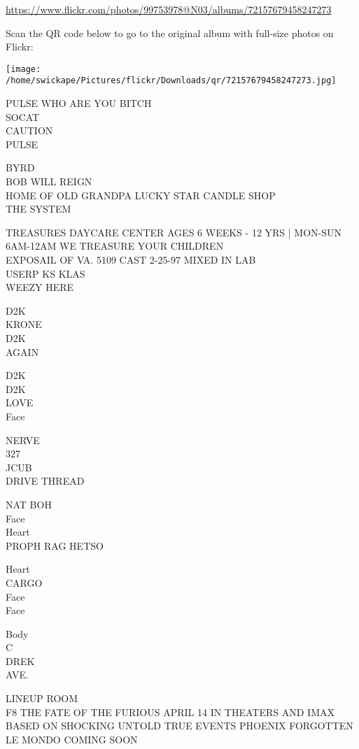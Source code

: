 \documentclass[10pt,letterpaper]{article}
\begin{document}
\url{https://www.flickr.com/photos/99753978@N03/albums/72157679458247273}

Scan the QR code below to go to the original album with full-size photos on Flickr:

\texttt{[image: /home/swickape/Pictures/flickr/Downloads/qr/72157679458247273.jpg]}


PULSE WHO ARE YOU BITCH\\
SOCAT\\
CAUTION\\
PULSE

BYRD\\
BOB WILL REIGN\\
HOME OF OLD GRANDPA LUCKY STAR CANDLE SHOP\\
THE SYSTEM

TREASURES DAYCARE CENTER AGES 6 WEEKS {-} 12 YRS | MON{-}SUN 6AM{-}12AM WE TREASURE YOUR CHILDREN\\
EXPOSAIL OF VA. 5109 CAST 2{-}25{-}97 MIXED IN LAB\\
USERP KS KLAS\\
WEEZY HERE

D2K\\
KRONE\\
D2K\\
AGAIN

D2K\\
D2K\\
LOVE\\
Face

NERVE\\
327\\
JCUB\\
DRIVE THREAD

NAT BOH\\
Face\\
Heart\\
PROPH RAG HETSO

Heart\\
CARGO\\
Face\\
Face

Body\\
C\\
DREK\\
AVE.

LINEUP ROOM\\
F8 THE FATE OF THE FURIOUS APRIL 14 IN THEATERS AND IMAX\\
BASED ON SHOCKING UNTOLD TRUE EVENTS PHOENIX FORGOTTEN\\
LE MONDO COMING SOON
\end{document}
